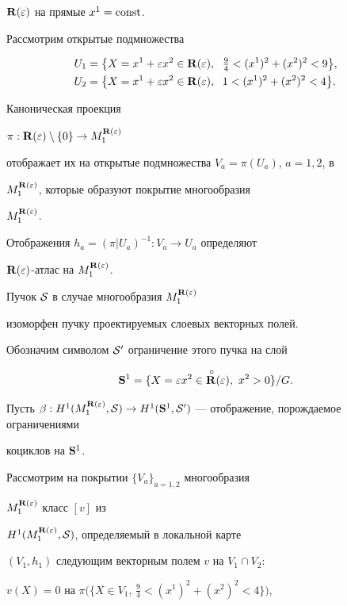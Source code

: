${\bold R}(\varepsilon)$ на прямые $x^1=\operatorname{const}$.


Рассмотрим открытые подмножества


\begin{align*}


U_1&=\big\{X=x^1+\varepsilon x^2\in\R(\varepsilon),


\ \; \tfrac{9}{4}<(x^1)^2+(x^2)^2<9\big\},\\


U_2&=\big\{X=x^1+\varepsilon x^2\in\R(\varepsilon),


\ \; 1<(x^1)^2+(x^2)^2<4\big\}.


\end{align*}


Каноническая проекция


$\pi:{\bold R}(\varepsilon)\setminus\{0\}\to M_1^{{\bold R}(\varepsilon)}$


отображает их на открытые подмножества $V_a=\pi(U_a)$, $a=1,2$, в


$M_1^{{\bold R}(\varepsilon)}$, которые образуют покрытие многообразия


$M_1^{{\bold R}(\varepsilon)}$.


Отображения $h_a=(\pi|U_a)^{-1}:V_a\to U_a$ определяют


${\bold R}(\varepsilon)$-атлас на $M_1^{{\bold R}(\varepsilon)}$.


Пучок $\cal S$ в случае многообразия $M_1^{{\bold R}(\varepsilon)}$


изоморфен пучку проектируемых слоевых векторных полей.


Обозначим символом ${\cal S}'$ ограничение этого пучка на слой


$$


{\bold S}^1=\{X=\varepsilon x^2\in{\puto \R}(\varepsilon),


\ x^2>0\}/G.


$$


Пусть $\beta:H^1(M_1^{\R(\varepsilon)},{\cal S})\to


H^1({\bold S}^1,{\cal S}')$ --- отображение, порождаемое ограничениями


коциклов на ${\bold S}^1$.


Рассмотрим на покрытии $\{V_a\}_{a=1,2}$ многообразия


$M_1^{{\bold R}(\varepsilon)}$ класс $[v]$ из


$H^1(M_1^{{\bold R}(\varepsilon)},{\cal S})$, определяемый в локальной карте


$(V_1,h_1)$ следующим векторным полем $v$ на $V_1\cap V_2$:


$v(X)=0$ на $\pi(\{X\in V_1$, $\frac{9}{4}<(x^1)^2+(x^2)^2<4\})$,


